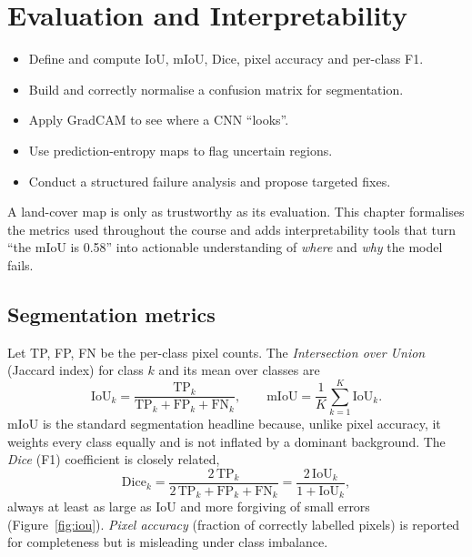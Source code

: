 \chapter{Evaluation and Interpretability}
\label{ch:eval}


\begin{objbox}
\begin{itemize}[leftmargin=1.2em,nosep]
  \item Define and compute IoU, mIoU, Dice, pixel accuracy and per-class F1.
  \item Build and correctly normalise a confusion matrix for segmentation.
  \item Apply GradCAM to see where a CNN ``looks''.
  \item Use prediction-entropy maps to flag uncertain regions.
  \item Conduct a structured failure analysis and propose targeted fixes.
\end{itemize}
\end{objbox}

A land-cover map is only as trustworthy as its evaluation. This chapter
formalises the metrics used throughout the course and adds interpretability
tools that turn ``the mIoU is 0.58'' into actionable understanding of \emph{where}
and \emph{why} the model fails.

\section{Segmentation metrics}

Let TP, FP, FN be the per-class pixel counts. The \emph{Intersection over Union}
(Jaccard index) for class $k$ and its mean over classes are
\begin{equation}
\mathrm{IoU}_k = \frac{\mathrm{TP}_k}{\mathrm{TP}_k+\mathrm{FP}_k+\mathrm{FN}_k},
\qquad
\mathrm{mIoU} = \frac{1}{K}\sum_{k=1}^{K}\mathrm{IoU}_k.
\label{eq:iou}
\end{equation}
mIoU is the standard segmentation headline because, unlike pixel accuracy, it
weights every class equally and is not inflated by a dominant background. The
\emph{Dice} (F1) coefficient is closely related,
\begin{equation}
\mathrm{Dice}_k = \frac{2\,\mathrm{TP}_k}{2\,\mathrm{TP}_k+\mathrm{FP}_k+\mathrm{FN}_k}
= \frac{2\,\mathrm{IoU}_k}{1+\mathrm{IoU}_k},
\end{equation}
always at least as large as IoU and more forgiving of small errors
(Figure~\ref{fig:iou}). \emph{Pixel accuracy} (fraction of correctly labelled
pixels) is reported for completeness but is misleading under class imbalance.

